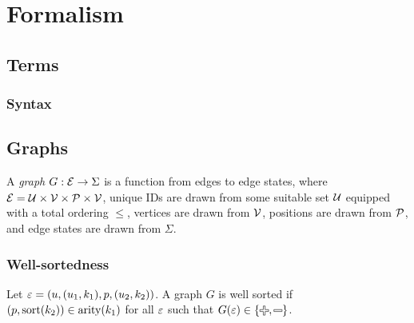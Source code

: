 \section{Formalism}



\subsection{Terms}


\subsubsection{Syntax}

\figureTermSyntaxContent


\subsection{Graphs}

\begin{definition}
  A \emph{graph} $G : \E \rightarrow \Sigma$ is a function from edges to edge states,
  where $\E = \U \times \V \times \P \times \V$,
  unique IDs are drawn from some suitable set $\U$ equipped with a total ordering $\leq$,
  vertices are drawn from $\V$,
  positions are drawn from $\P$,
  and edge states are drawn from $\Sigma$.
\end{definition}


\subsubsection{Well-sortedness}

\figureArityContent

\begin{definition}
  Let $\e = (u, (u_1, k_1), p, (u_2, k_2))$.
  A graph $G$ is well sorted if $(p, \sort(k_2)) \in \arity(k_1)$
  for all $\e$ such that $G(\e) \in \{\Plus, \Minus\}$.
\end{definition}


